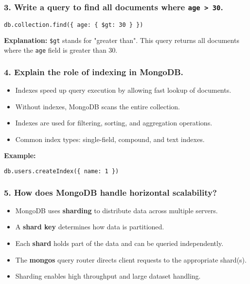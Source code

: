 \documentclass{article}
\begin{document}
\subsubsection*{3. Write a query to find all documents where \texttt{age > 30}.}

\begin{verbatim}
db.collection.find({ age: { $gt: 30 } })
\end{verbatim}

\textbf{Explanation:} \verb|$gt| stands for "greater than". This query returns all documents where the \verb|age| field is greater than 30.

\subsubsection*{4. Explain the role of indexing in MongoDB.}

\begin{itemize}
    \item Indexes speed up query execution by allowing fast lookup of documents.
    \item Without indexes, MongoDB scans the entire collection.
    \item Indexes are used for filtering, sorting, and aggregation operations.
    \item Common index types: single-field, compound, and text indexes.
\end{itemize}

\textbf{Example:}
\begin{verbatim}
db.users.createIndex({ name: 1 })
\end{verbatim}

\subsubsection*{5. How does MongoDB handle horizontal scalability?}

\begin{itemize}
    \item MongoDB uses \textbf{sharding} to distribute data across multiple servers.
    \item A \textbf{shard key} determines how data is partitioned.
    \item Each \textbf{shard} holds part of the data and can be queried independently.
    \item The \textbf{mongos} query router directs client requests to the appropriate shard(s).
    \item Sharding enables high throughput and large dataset handling.
\end{itemize}
\end{document}

